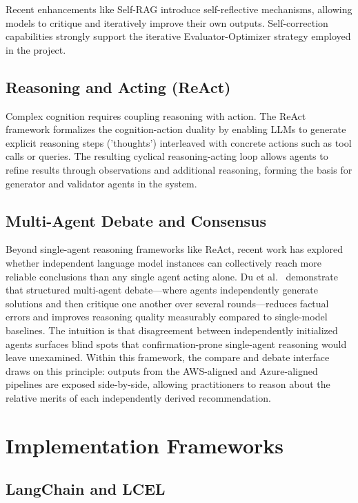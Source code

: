 Recent enhancements like Self-RAG \cite{asai2023selfrag} introduce self-reflective mechanisms, allowing models to critique and iteratively improve their own outputs. Self-correction capabilities strongly support the iterative Evaluator-Optimizer strategy employed in the project.

\subsection{Reasoning and Acting (ReAct)}

Complex cognition requires coupling reasoning with action. The ReAct framework \cite{yao2023react} formalizes the cognition-action duality by enabling LLMs to generate explicit reasoning steps ('thoughts') interleaved with concrete actions such as tool calls or queries. The resulting cyclical reasoning-acting loop allows agents to refine results through observations and additional reasoning, forming the basis for generator and validator agents in the system.

\subsection{Multi-Agent Debate and Consensus}

Beyond single-agent reasoning frameworks like ReAct, recent work has explored whether independent language model instances can collectively reach more reliable conclusions than any single agent acting alone. Du et al.~\cite{du2023improving} demonstrate that structured multi-agent debate---where agents independently generate solutions and then critique one another over several rounds---reduces factual errors and improves reasoning quality measurably compared to single-model baselines. The intuition is that disagreement between independently initialized agents surfaces blind spots that confirmation-prone single-agent reasoning would leave unexamined. Within this framework, the compare and debate interface draws on this principle: outputs from the AWS-aligned and Azure-aligned pipelines are exposed side-by-side, allowing practitioners to reason about the relative merits of each independently derived recommendation.

\section{Implementation Frameworks}

\subsection{LangChain and LCEL}

